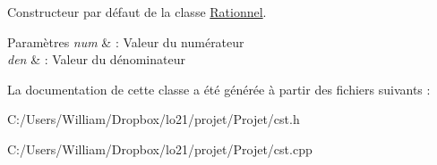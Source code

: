Constructeur par défaut de la classe \hyperlink{classcalcul_1_1_rationnel}{Rationnel}. 


\begin{DoxyParams}{Paramètres}
{\em num} & \-: Valeur du numérateur \\
\hline
{\em den} & \-: Valeur du dénominateur \\
\hline
\end{DoxyParams}


La documentation de cette classe a été générée à partir des fichiers suivants \-:\begin{DoxyCompactItemize}
\item 
C\-:/\-Users/\-William/\-Dropbox/lo21/projet/\-Projet/cst.\-h\item 
C\-:/\-Users/\-William/\-Dropbox/lo21/projet/\-Projet/cst.\-cpp\end{DoxyCompactItemize}

